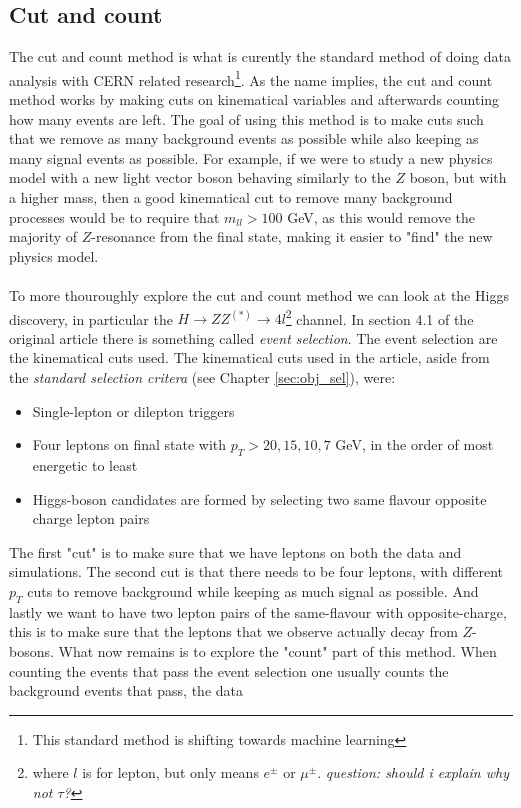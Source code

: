 \documentclass[12pt, a4paper]{book}
\begin{document}
\subsection{Cut and count}
The cut and count method is what is curently the standard method of doing data analysis with CERN related research\footnote{This standard method is shifting towards machine learning}. As the name implies, the cut and count method works by making cuts on kinematical variables and afterwards counting how many events are left. 
The goal of using this method is to make cuts such that we remove as many background events as possible while also keeping as many signal events as possible. For example, if we were to study a new physics model with a new light vector boson behaving similarly to the $Z$ boson, but with a higher mass, 
then a good kinematical cut to remove many background processes would be to require that $m_{ll}>100$ GeV, as this would remove the majority of $Z$-resonance from the final state, making it easier to "find" the new physics model. \\
\\To more thouroughly explore the cut and count method we can look at the Higgs discovery, in particular the $H\rightarrow ZZ^{(*)} \rightarrow 4l$\footnote{where $l$ is for lepton, but only means $e^\pm$ or $\mu^\pm$. \textit{question: should i explain why not $\tau$?}} channel. 
In section 4.1 of the original article \cite{Higgs_discovery_2012} there is something called \textit{event selection}. The event selection are the kinematical cuts used. The kinematical cuts used in the article, aside from the \textit{standard selection critera} 
(see Chapter \ref{sec:obj_sel}), were:
\begin{itemize}
    \item Single-lepton or dilepton triggers
    \item Four leptons on final state with $p_T >20,15,10,7$ GeV, in the order of most energetic to least
    \item Higgs-boson candidates are formed by selecting two same flavour opposite charge lepton pairs
\end{itemize}
The first "cut" is to make sure that we have leptons on both the data and simulations. The second cut is that there needs to be four leptons, with different $p_T$ cuts to remove background while keeping as much signal as possible. And lastly we want to have two lepton pairs of the same-flavour 
with opposite-charge, this is to make sure that the leptons that we observe actually decay from $Z$-bosons. What now remains is to explore the "count" part of this method. When counting the events that pass the event selection one usually counts the background events that pass, the data 
\end{document}
